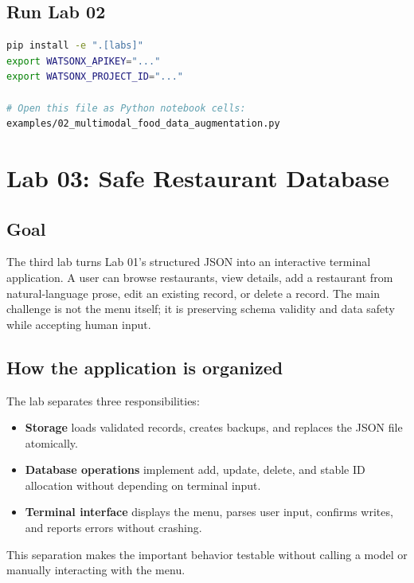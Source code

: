 \documentclass[11pt]{article}
\begin{document}
\subsection{Run Lab 02}

\begin{lstlisting}[language=bash]
pip install -e ".[labs]"
export WATSONX_APIKEY="..."
export WATSONX_PROJECT_ID="..."

# Open this file as Python notebook cells:
examples/02_multimodal_food_data_augmentation.py
\end{lstlisting}

\section{Lab 03: Safe Restaurant Database}

\subsection{Goal}

The third lab turns Lab 01's structured JSON into an interactive terminal
application. A user can browse restaurants, view details, add a restaurant from
natural-language prose, edit an existing record, or delete a record. The main
challenge is not the menu itself; it is preserving schema validity and data
safety while accepting human input.

\subsection{How the application is organized}

The lab separates three responsibilities:

\begin{itemize}
  \item \textbf{Storage} loads validated records, creates backups, and replaces
        the JSON file atomically.
  \item \textbf{Database operations} implement add, update, delete, and stable
        ID allocation without depending on terminal input.
  \item \textbf{Terminal interface} displays the menu, parses user input,
        confirms writes, and reports errors without crashing.
\end{itemize}

This separation makes the important behavior testable without calling a model
or manually interacting with the menu.
\end{document}
